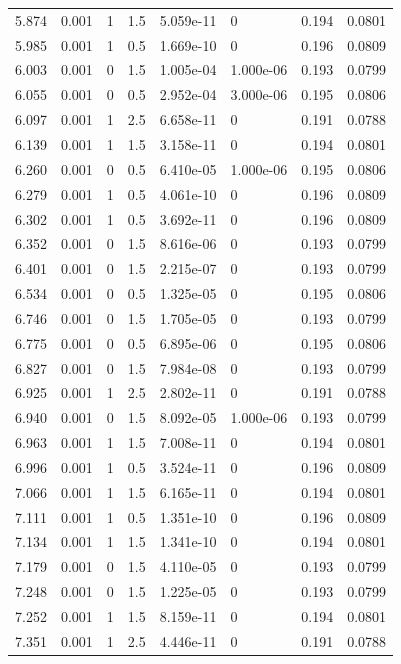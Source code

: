 \documentclass[preview]{standalone}
\begin{document}
{{{\begin{tabular}{L{1.2cm}C{1.2cm} C{0.3cm}C{0.5cm} C{1.4cm}C{1.4cm} C{1.4cm}C{1.4cm}}
  5.874  &  0.001  & 1     & 1.5 &  5.059e-11  & 0  & 0.194 &  0.0801   \\ 
  5.985  &  0.001  & 1     & 0.5 &  1.669e-10  & 0  & 0.196 &  0.0809   \\ 
  6.003  &  0.001  & 0     & 1.5 &  1.005e-04  & 1.000e-06  & 0.193 &  0.0799   \\ 
  6.055  &  0.001  & 0     & 0.5 &  2.952e-04  & 3.000e-06  & 0.195 &  0.0806   \\ 
  6.097  &  0.001  & 1     & 2.5 &  6.658e-11  & 0  & 0.191 &  0.0788   \\ 
  6.139  &  0.001  & 1     & 1.5 &  3.158e-11  & 0  & 0.194 &  0.0801   \\ 
  6.260  &  0.001  & 0     & 0.5 &  6.410e-05  & 1.000e-06  & 0.195 &  0.0806   \\ 
  6.279  &  0.001  & 1     & 0.5 &  4.061e-10  & 0  & 0.196 &  0.0809   \\ 
  6.302  &  0.001  & 1     & 0.5 &  3.692e-11  & 0  & 0.196 &  0.0809   \\ 
  6.352  &  0.001  & 0     & 1.5 &  8.616e-06  & 0  & 0.193 &  0.0799   \\ 
  6.401  &  0.001  & 0     & 1.5 &  2.215e-07  & 0  & 0.193 &  0.0799   \\ 
  6.534  &  0.001  & 0     & 0.5 &  1.325e-05  & 0  & 0.195 &  0.0806   \\ 
  6.746  &  0.001  & 0     & 1.5 &  1.705e-05  & 0  & 0.193 &  0.0799   \\ 
  6.775  &  0.001  & 0     & 0.5 &  6.895e-06  & 0  & 0.195 &  0.0806   \\ 
  6.827  &  0.001  & 0     & 1.5 &  7.984e-08  & 0  & 0.193 &  0.0799   \\ 
  6.925  &  0.001  & 1     & 2.5 &  2.802e-11  & 0  & 0.191 &  0.0788   \\ 
  6.940  &  0.001  & 0     & 1.5 &  8.092e-05  & 1.000e-06  & 0.193 &  0.0799   \\ 
  6.963  &  0.001  & 1     & 1.5 &  7.008e-11  & 0  & 0.194 &  0.0801   \\ 
  6.996  &  0.001  & 1     & 0.5 &  3.524e-11  & 0  & 0.196 &  0.0809   \\ 
  7.066  &  0.001  & 1     & 1.5 &  6.165e-11  & 0  & 0.194 &  0.0801   \\ 
  7.111  &  0.001  & 1     & 0.5 &  1.351e-10  & 0  & 0.196 &  0.0809   \\ 
  7.134  &  0.001  & 1     & 1.5 &  1.341e-10  & 0  & 0.194 &  0.0801   \\ 
  7.179  &  0.001  & 0     & 1.5 &  4.110e-05  & 0  & 0.193 &  0.0799   \\ 
  7.248  &  0.001  & 0     & 1.5 &  1.225e-05  & 0  & 0.193 &  0.0799   \\ 
  7.252  &  0.001  & 1     & 1.5 &  8.159e-11  & 0  & 0.194 &  0.0801   \\ 
  7.351  &  0.001  & 1     & 2.5 &  4.446e-11  & 0  & 0.191 &  0.0788   \\ 
\hline 
\end{tabular} 

}}}
\end{document}
